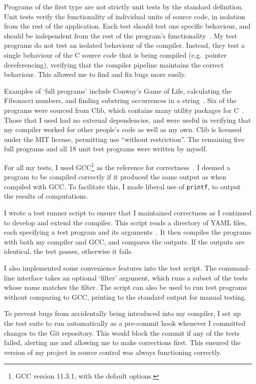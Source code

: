 \documentclass[00-main.tex]{subfiles}
\begin{document}
Programs of the first type are not strictly unit tests by the standard definition.
Unit tests verify the functionality of individual units of source code, in isolation from the rest of the application.
Each test should test one specific behaviour, and should be independent from the rest of the program's functionality~.
My test programs do not test an isolated behaviour of the compiler.
Instead, they test a single behaviour of the C source code that is being compiled (e.g.~pointer dereferencing), verifying that the compiler pipeline maintains the correct behaviour.
This allowed me to find and fix bugs more easily.

Examples of `full programs' include Conway's Game of Life, calculating the Fibonacci numbers, and finding substring occurrences in a string~.
Six of the programs were sourced from Clib, which contains many utility packages for C~.
Those that I used had no external dependencies, and were useful in verifying that my compiler worked for other people's code as well as my own.
Clib is licensed under the MIT license, permitting use ``without restriction''.
The remaining five full programs and all 18 unit test programs were written by myself.

For all my tests, I used GCC\footnote{GCC version 11.3.1, with the default options.} as the reference for correctness~.
I deemed a program to be compiled correctly if it produced the same output as when compiled with GCC\@.
To facilitate this, I made liberal use of \texttt{printf}, to output the results of computations.

I wrote a test runner script to ensure that I maintained correctness as I continued to develop and extend the compiler.
This script reads a directory of YAML files, each specifying a test program and its arguments~.
It then compiles the programs with both my compiler and GCC, and compares the outputs.
If the outputs are identical, the test passes, otherwise it fails.

I also implemented some convenience features into the test script.
The command-line interface takes an optional `filter' argument, which runs a subset of the tests whose name matches the filter.
The script can also be used to run test programs without comparing to GCC, printing to the standard output for manual testing.

To prevent bugs from accidentally being introduced into my compiler, I set up the test suite to run automatically as a pre-commit hook whenever I committed changes to the Git repository.
This would block the commit if any of the tests failed, alerting me and allowing me to make corrections first.
This ensured the version of my project in source control was always functioning correctly.
\end{document}
